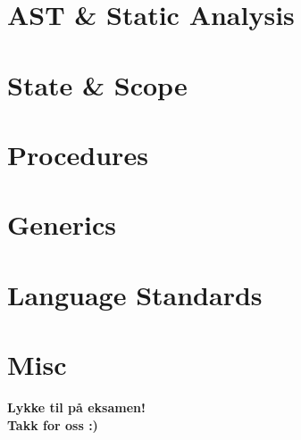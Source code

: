 \section{AST \& Static Analysis}


\section{State \& Scope}


\section{Procedures}


\section{Generics}


\section{Language Standards}


\section{Misc}





\begin{frame}
\begin{center}
\begin{Large}
\textbf{Lykke til på eksamen!\\[5mm]
Takk for oss :)}

\end{Large}
\end{center}  
\end{frame}
